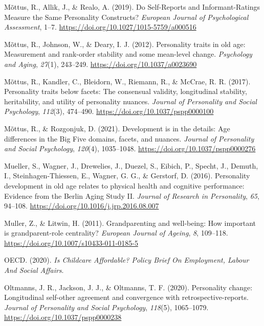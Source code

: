 \documentclass[
  english,
  man, noextraspace]{apa7}
\begin{document}
\leavevmode\hypertarget{ref-mottusSelfReportsInformantRatingsMeasure2019}{}%
Mõttus, R., Allik, J., \& Realo, A. (2019). Do Self-Reports and Informant-Ratings Measure the Same Personality Constructs? \emph{European Journal of Psychological Assessment}, 1--7. \url{https://doi.org/10.1027/1015-5759/a000516}

\leavevmode\hypertarget{ref-mottusPersonalityTraitsOld2012}{}%
Mõttus, R., Johnson, W., \& Deary, I. J. (2012). Personality traits in old age: Measurement and rank-order stability and some mean-level change. \emph{Psychology and Aging}, \emph{27}(1), 243--249. \url{https://doi.org/10.1037/a0023690}

\leavevmode\hypertarget{ref-mottusPersonalityTraitsFacets2017}{}%
Mõttus, R., Kandler, C., Bleidorn, W., Riemann, R., \& McCrae, R. R. (2017). Personality traits below facets: The consensual validity, longitudinal stability, heritability, and utility of personality nuances. \emph{Journal of Personality and Social Psychology}, \emph{112}(3), 474--490. \url{https://doi.org/10.1037/pspp0000100}

\leavevmode\hypertarget{ref-mottusDevelopmentDetailsAge2021}{}%
Mõttus, R., \& Rozgonjuk, D. (2021). Development is in the details: Age differences in the Big Five domains, facets, and nuances. \emph{Journal of Personality and Social Psychology}, \emph{120}(4), 1035--1048. \url{https://doi.org/10.1037/pspp0000276}

\leavevmode\hypertarget{ref-muellerPersonalityDevelopmentOld2016}{}%
Mueller, S., Wagner, J., Drewelies, J., Duezel, S., Eibich, P., Specht, J., Demuth, I., Steinhagen-Thiessen, E., Wagner, G. G., \& Gerstorf, D. (2016). Personality development in old age relates to physical health and cognitive performance: Evidence from the Berlin Aging Study II. \emph{Journal of Research in Personality}, \emph{65}, 94--108. \url{https://doi.org/10.1016/j.jrp.2016.08.007}

\leavevmode\hypertarget{ref-mullerGrandparentingWellbeingHow2011}{}%
Muller, Z., \& Litwin, H. (2011). Grandparenting and well-being: How important is grandparent-role centrality? \emph{European Journal of Ageing}, \emph{8}, 109--118. \url{https://doi.org/10.1007/s10433-011-0185-5}

\leavevmode\hypertarget{ref-oecdChildcareAffordablePolicy2020}{}%
OECD. (2020). \emph{Is Childcare Affordable? Policy Brief On Employment, Labour And Social Affairs}.

\leavevmode\hypertarget{ref-oltmannsPersonalityChangeLongitudinal2020}{}%
Oltmanns, J. R., Jackson, J. J., \& Oltmanns, T. F. (2020). Personality change: Longitudinal self-other agreement and convergence with retrospective-reports. \emph{Journal of Personality and Social Psychology}, \emph{118}(5), 1065--1079. \url{https://doi.org/10.1037/pspp0000238}
\end{document}
